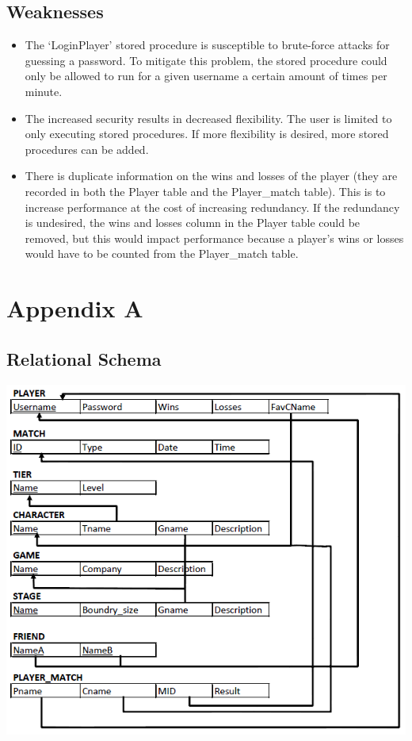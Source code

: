 \documentclass{article}
\begin{document}
\subsection{Weaknesses}
\begin{itemize}
\item The `LoginPlayer' stored procedure is susceptible to brute-force attacks for guessing a password. To mitigate this problem, the stored procedure could only be allowed to run for a given username a certain amount of times per minute.
\item The increased security results in decreased flexibility. The user is limited to only executing stored procedures. If more flexibility is desired, more stored procedures can be added.
\item There is duplicate information on the wins and losses of the player (they are recorded in both the Player table and the Player\_match table). This is to increase performance at the cost of increasing redundancy. If the redundancy is undesired, the wins and losses column in the Player table could be removed, but this would impact performance because a player's wins or losses would have to be counted from the Player\_match table.
\end{itemize}

\section{Appendix A}
\subsection{Relational Schema}
\includegraphics[keepaspectratio, width=6in]{Relational Schema.png}\\
\end{document}
